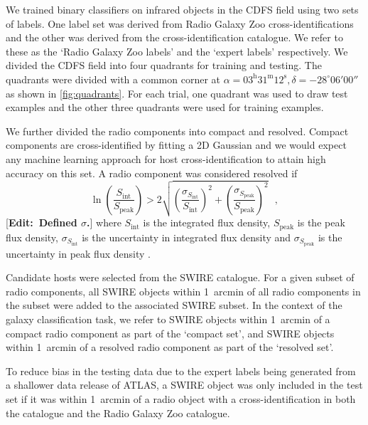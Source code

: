 \documentclass[fleqn,usenatbib,usedcolumn]{mnras}
\newcommand{\edit}[1]{ {\color{red}[{\bf Edit:~{#1}}]} }
\begin{document}
    We trained binary classifiers on infrared objects in the CDFS field using two sets of labels. One label set was derived from
    Radio Galaxy Zoo cross-identifications and the other was derived from the
    \citet{norris06} cross-identification catalogue. We refer to these as the
    `Radio Galaxy Zoo labels' and the `expert labels' respectively. We divided the
    CDFS field into four quadrants for training and testing. The quadrants
    were divided with a common corner at $\alpha = 03^\text{h}31^\text{m}12^\text{s},
    \delta = -28^\circ{}06'00''$ as shown in \autoref{fig:quadrants}. For
    each trial, one quadrant was used to draw test examples and the other three
    quadrants were used for training examples.

    We further divided the radio components into compact and resolved. Compact
    components are cross-identified by fitting a 2D Gaussian \citep[as
    in][]{norris06} and we would expect any machine learning approach for host
    cross-identification to attain high accuracy on this set. A radio component was
    considered resolved if
    \begin{equation}
        \ln \left(
          \frac{S_{\text{int}}}
               {S_{\text{peak}}}
        \right) > 2\sqrt{\left(
          \frac{\sigma_{S_{\text{int}}}}
               {S_{\text{int}}}
        \right)^2 + \left(
          \frac{\sigma_{S_{\text{peak}}}}
               {S_{\text{peak}}}
        \right)^2}\,\,\,\,,
    \end{equation}%
    \edit{Defined $\sigma$.} where \(S_{\text{int}}\) is the integrated flux density, \(S_{\text{peak}}\) is the peak flux density, $\sigma_{S_{\text{int}}}$ is the uncertainty in integrated flux density and $\sigma_{S_{\text{peak}}}$ is the uncertainty in peak flux density \citep[following][]{franzen15}.

    Candidate hosts were selected from the SWIRE catalogue. For a given subset
    of radio components, all SWIRE objects within 1~arcmin of all radio
    components in the subset were added to the associated SWIRE subset. In the
    context of the galaxy classification task, we refer to SWIRE objects
    within 1~arcmin of a compact radio component as part of the `compact set',
    and SWIRE objects within 1~arcmin of a resolved radio component as part of
    the `resolved set'.

    To reduce
    bias in the testing data due to the expert labels being generated from a
    shallower data release of ATLAS, a SWIRE object was only included in the test
    set if it was within 1~arcmin of a radio object with a cross-identification
    in both the \citet{norris06} catalogue and the Radio Galaxy Zoo catalogue.
\end{document}
